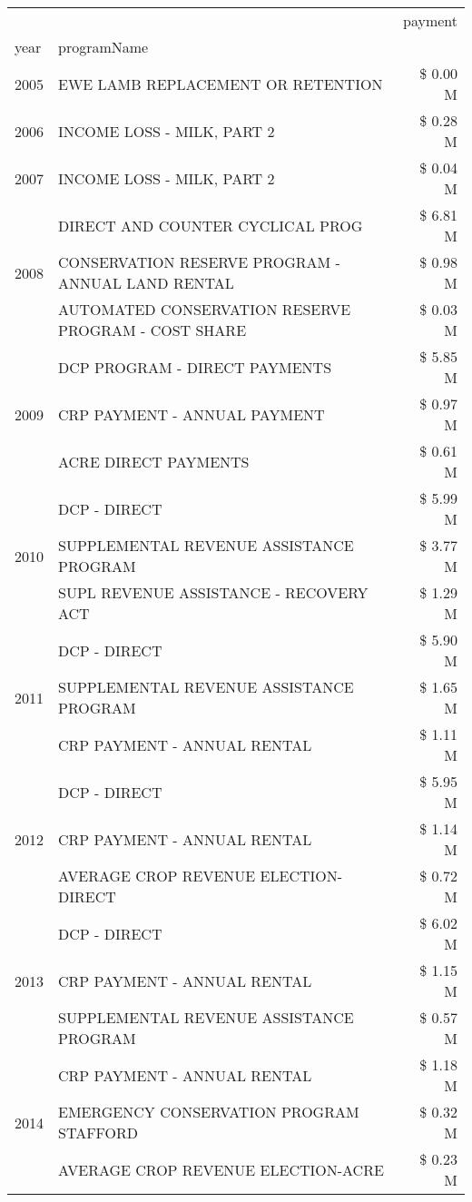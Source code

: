 \begin{tabular}{llr}
\toprule
 &  & payment \\
year & programName &  \\
\midrule
2005 & EWE LAMB REPLACEMENT OR RETENTION & \$ 0.00 M \\
\cline{1-3}
2006 & INCOME LOSS - MILK, PART 2 & \$ 0.28 M \\
\cline{1-3}
2007 & INCOME LOSS - MILK, PART 2 & \$ 0.04 M \\
\cline{1-3}
\multirow[t]{3}{*}{2008} & DIRECT AND COUNTER CYCLICAL PROG & \$ 6.81 M \\
 & CONSERVATION RESERVE PROGRAM - ANNUAL LAND RENTAL & \$ 0.98 M \\
 & AUTOMATED CONSERVATION RESERVE PROGRAM - COST SHARE & \$ 0.03 M \\
\cline{1-3}
\multirow[t]{3}{*}{2009} & DCP PROGRAM - DIRECT PAYMENTS & \$ 5.85 M \\
 & CRP PAYMENT - ANNUAL PAYMENT & \$ 0.97 M \\
 & ACRE DIRECT PAYMENTS & \$ 0.61 M \\
\cline{1-3}
\multirow[t]{3}{*}{2010} & DCP - DIRECT & \$ 5.99 M \\
 & SUPPLEMENTAL REVENUE ASSISTANCE PROGRAM & \$ 3.77 M \\
 & SUPL REVENUE ASSISTANCE - RECOVERY ACT & \$ 1.29 M \\
\cline{1-3}
\multirow[t]{3}{*}{2011} & DCP - DIRECT & \$ 5.90 M \\
 & SUPPLEMENTAL REVENUE ASSISTANCE PROGRAM & \$ 1.65 M \\
 & CRP PAYMENT - ANNUAL RENTAL & \$ 1.11 M \\
\cline{1-3}
\multirow[t]{3}{*}{2012} & DCP - DIRECT & \$ 5.95 M \\
 & CRP PAYMENT - ANNUAL RENTAL & \$ 1.14 M \\
 & AVERAGE CROP REVENUE ELECTION-DIRECT & \$ 0.72 M \\
\cline{1-3}
\multirow[t]{3}{*}{2013} & DCP - DIRECT & \$ 6.02 M \\
 & CRP PAYMENT - ANNUAL RENTAL & \$ 1.15 M \\
 & SUPPLEMENTAL REVENUE ASSISTANCE PROGRAM & \$ 0.57 M \\
\cline{1-3}
\multirow[t]{3}{*}{2014} & CRP PAYMENT - ANNUAL RENTAL & \$ 1.18 M \\
 & EMERGENCY CONSERVATION PROGRAM STAFFORD & \$ 0.32 M \\
 & AVERAGE CROP REVENUE ELECTION-ACRE & \$ 0.23 M \\

\end{tabular}
